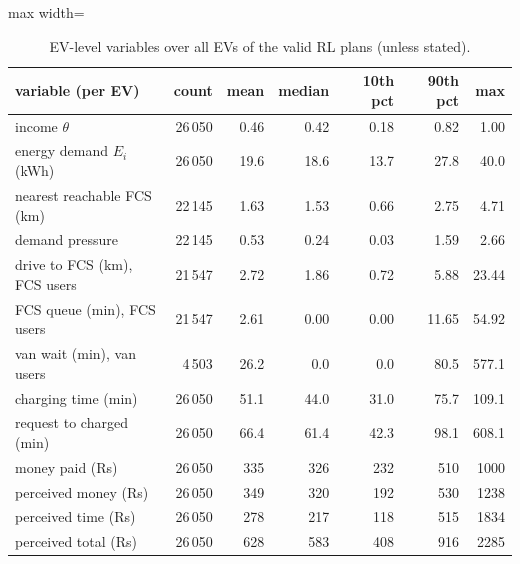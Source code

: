 \begin{table}[H]\centering
\small
\caption{EV-level variables over all EVs of the valid RL plans (unless stated).}\label{tab:evstats}
\begin{adjustbox}{max width=\textwidth}\begin{tabular}{lrrrrrr}\toprule
variable (per EV) & count & mean & median & 10th pct & 90th pct & max \\ \midrule
income $\theta$ & 26\,050 & 0.46 & 0.42 & 0.18 & 0.82 & 1.00 \\
energy demand $E_i$ (kWh) & 26\,050 & 19.6 & 18.6 & 13.7 & 27.8 & 40.0 \\
nearest reachable FCS (km) & 22\,145 & 1.63 & 1.53 & 0.66 & 2.75 & 4.71 \\
demand pressure & 22\,145 & 0.53 & 0.24 & 0.03 & 1.59 & 2.66 \\
drive to FCS (km), FCS users & 21\,547 & 2.72 & 1.86 & 0.72 & 5.88 & 23.44 \\
FCS queue (min), FCS users & 21\,547 & 2.61 & 0.00 & 0.00 & 11.65 & 54.92 \\
van wait (min), van users & 4\,503 & 26.2 & 0.0 & 0.0 & 80.5 & 577.1 \\
charging time (min) & 26\,050 & 51.1 & 44.0 & 31.0 & 75.7 & 109.1 \\
request to charged (min) & 26\,050 & 66.4 & 61.4 & 42.3 & 98.1 & 608.1 \\
money paid (Rs) & 26\,050 & 335 & 326 & 232 & 510 & 1000 \\
perceived money (Rs) & 26\,050 & 349 & 320 & 192 & 530 & 1238 \\
perceived time (Rs) & 26\,050 & 278 & 217 & 118 & 515 & 1834 \\
perceived total (Rs) & 26\,050 & 628 & 583 & 408 & 916 & 2285 \\
\bottomrule\end{tabular}\end{adjustbox}\end{table}
